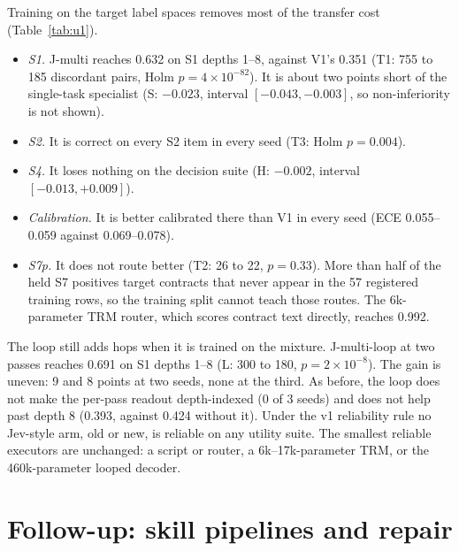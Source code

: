 \documentclass[11pt]{article}
\begin{document}
\begin{table}[t]
\centering
\small

\caption{SPEC-U1: accuracy averaged over training seeds (number of seeds in brackets). S1 on the
shared families; S7 with the shortlist shuffled (S7p), the only S7 order that does not reward a
position prior. Generated from the run records.}
\label{tab:u1}
\end{table}

Training on the target label spaces removes most of the transfer cost (Table~\ref{tab:u1}).
\begin{itemize}
  \item \emph{S1.} J-multi reaches 0.632 on S1 depths 1--8, against V1's 0.351 (T1: 755 to 185
  discordant pairs, Holm $p=4\times10^{-82}$). It is about two points short of the single-task
  specialist (S: $-0.023$, interval $[-0.043,-0.003]$, so non-inferiority is not shown).
  \item \emph{S2.} It is correct on every S2 item in every seed (T3: Holm $p=0.004$).
  \item \emph{S4.} It loses nothing on the decision suite (H: $-0.002$, interval
  $[-0.013,+0.009]$).
  \item \emph{Calibration.} It is better calibrated there than V1 in every seed (ECE 0.055--0.059
  against 0.069--0.078).
  \item \emph{S7p.} It does not route better (T2: 26 to 22, $p=0.33$). More than half of the held
  S7 positives target contracts that never appear in the 57 registered training rows, so the
  training split cannot teach those routes. The 6k-parameter TRM router, which scores contract
  text directly, reaches 0.992.
\end{itemize}

The loop still adds hops when it is trained on the mixture. J-multi-loop at two passes reaches
0.691 on S1 depths 1--8 (L: 300 to 180, $p=2\times10^{-8}$). The gain is uneven: 9 and 8 points
at two seeds, none at the third. As before, the loop does not make the per-pass readout
depth-indexed (0 of 3 seeds) and does not help past depth 8 (0.393, against 0.424 without it).
Under the v1 reliability rule no Jev-style arm, old or new, is reliable on any utility suite. The
smallest reliable executors are unchanged: a script or router, a 6k--17k-parameter TRM, or the
460k-parameter looped decoder.

\section{Follow-up: skill pipelines and repair}
\label{sec:u2u6}
\end{document}
